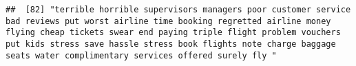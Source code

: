 \documentclass[
]{article}
\begin{document}
\begin{verbatim}
##  [82] "terrible horrible supervisors managers poor customer service bad reviews put worst airline time booking regretted airline money flying cheap tickets swear end paying triple flight problem vouchers put kids stress save hassle stress book flights note charge baggage seats water complimentary services offered surely fly "                                                                                                                                                                                                                                                                                                                                                                                                                                                                                                                                                                                                                                                                                                                                                                                                                                                                                                                                                                                                                                                                                                                                                                                                                                                                                                                                                                                                                                                               

\end{verbatim}
\end{document}
